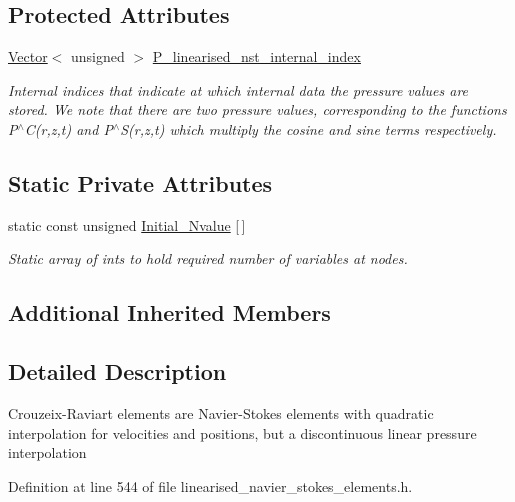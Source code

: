 \subsection*{Protected Attributes}
\begin{DoxyCompactItemize}
\item 
\hyperlink{classoomph_1_1Vector}{Vector}$<$ unsigned $>$ \hyperlink{classoomph_1_1LinearisedQCrouzeixRaviartElement_ac9cd03df3d45e742cf79ea5c67d69614}{P\+\_\+linearised\+\_\+nst\+\_\+internal\+\_\+index}
\begin{DoxyCompactList}\small\item\em Internal indices that indicate at which internal data the pressure values are stored. We note that there are two pressure values, corresponding to the functions P$^\wedge$C(r,z,t) and P$^\wedge$S(r,z,t) which multiply the cosine and sine terms respectively. \end{DoxyCompactList}\end{DoxyCompactItemize}
\subsection*{Static Private Attributes}
\begin{DoxyCompactItemize}
\item 
static const unsigned \hyperlink{classoomph_1_1LinearisedQCrouzeixRaviartElement_a0dab34c0ac21f083e33ede23efeae0e0}{Initial\+\_\+\+Nvalue} \mbox{[}$\,$\mbox{]}
\begin{DoxyCompactList}\small\item\em Static array of ints to hold required number of variables at nodes. \end{DoxyCompactList}\end{DoxyCompactItemize}
\subsection*{Additional Inherited Members}


\subsection{Detailed Description}
Crouzeix-\/\+Raviart elements are Navier-\/\+Stokes elements with quadratic interpolation for velocities and positions, but a discontinuous linear pressure interpolation 

Definition at line 544 of file linearised\+\_\+navier\+\_\+stokes\+\_\+elements.\+h.



